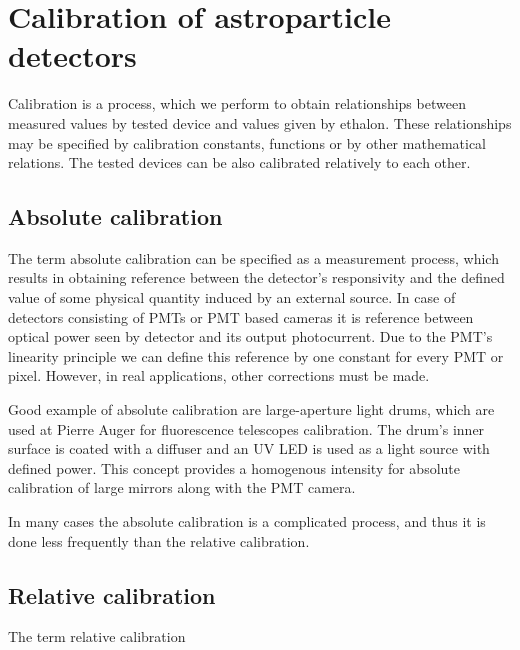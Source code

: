 
\chapter{Calibration of astroparticle detectors}
Calibration is a process, which we perform to obtain relationships between measured values by tested device and values given by ethalon. These relationships may be specified by calibration constants, functions or by other mathematical relations. The tested devices can be also calibrated relatively to each other.
\par
\section{Absolute calibration}
The term absolute calibration can be specified as a measurement process, which results in obtaining reference between the detector's responsivity and the defined value of some physical quantity induced by an external source. In case of detectors consisting of PMTs or PMT based cameras it is reference between optical power seen by detector and its output photocurrent. Due to the PMT's linearity principle we can define this reference by one constant for every PMT or pixel. However, in real applications, other corrections must be made.

\par
Good example of absolute calibration are large-aperture light drums, which are used at Pierre Auger for fluorescence telescopes calibration. The drum's inner surface is coated with a diffuser and an UV LED is used as a light source with defined power. This concept provides a homogenous intensity for absolute calibration of large mirrors along with the PMT camera. 

\par
In many cases the absolute calibration is a complicated process, and thus it is done less frequently than the relative calibration.

\section{Relative calibration}
The term relative calibration 


